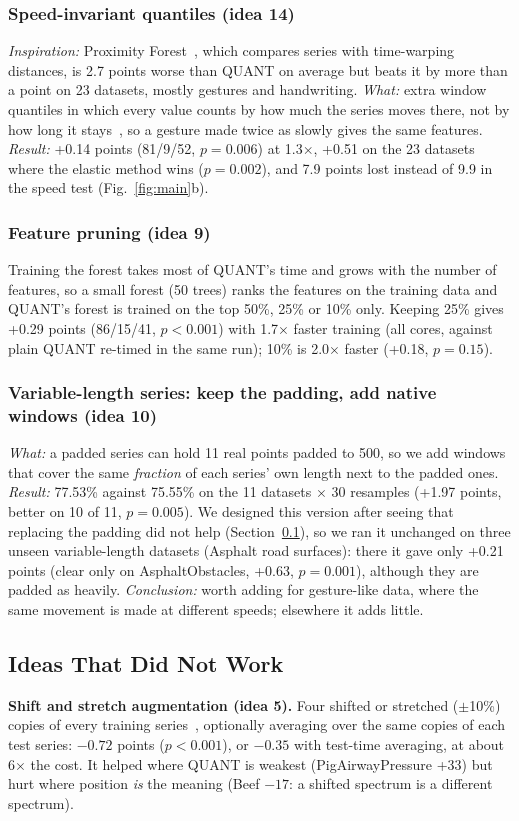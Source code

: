 \documentclass[conference]{IEEEtran}
\begin{document}
\subsubsection{Speed-invariant quantiles (idea 14)}
\emph{Inspiration:} Proximity Forest~\cite{pf}, which compares series with time-warping distances, is 2.7 points worse than QUANT on average but beats it by more than a point on 23 datasets, mostly gestures and handwriting. \emph{What:} extra window quantiles in which every value counts by how much the series moves there, not by how long it stays~\cite{banach}, so a gesture made twice as slowly gives the same features. \emph{Result:} +0.14 points (81/9/52, $p=0.006$) at 1.3$\times$, +0.51 on the 23 datasets where the elastic method wins ($p=0.002$), and 7.9 points lost instead of 9.9 in the speed test (Fig.~\ref{fig:main}b).

\subsubsection{Feature pruning (idea 9)}
Training the forest takes most of QUANT's time and grows with the number of features, so a small forest (50 trees) ranks the features on the training data and QUANT's forest is trained on the top 50\%, 25\% or 10\% only. Keeping 25\% gives +0.29 points (86/15/41, $p<0.001$) with 1.7$\times$ faster training (all cores, against plain QUANT re-timed in the same run); 10\% is 2.0$\times$ faster (+0.18, $p=0.15$).

\subsubsection{Variable-length series: keep the padding, add native windows (idea 10)}
\label{sec:varlen}
\emph{What:} a padded series can hold 11 real points padded to 500, so we add windows that cover the same \emph{fraction} of each series' own length next to the padded ones. \emph{Result:} 77.53\% against 75.55\% on the 11 datasets $\times$ 30 resamples (+1.97 points, better on 10 of 11, $p=0.005$). We designed this version after seeing that replacing the padding did not help (Section~\ref{sec:failed}), so we ran it unchanged on three unseen variable-length datasets (Asphalt road surfaces): there it gave only +0.21 points (clear only on AsphaltObstacles, +0.63, $p=0.001$), although they are padded as heavily. \emph{Conclusion:} worth adding for gesture-like data, where the same movement is made at different speeds; elsewhere it adds little.

\subsection{Ideas That Did Not Work}
\label{sec:failed}
\textbf{Shift and stretch augmentation (idea 5).} Four shifted or stretched ($\pm$10\%) copies of every training series~\cite{leguennec}, optionally averaging over the same copies of each test series: $-0.72$ points ($p<0.001$), or $-0.35$ with test-time averaging, at about 6$\times$ the cost. It helped where QUANT is weakest (PigAirwayPressure +33) but hurt where position \emph{is} the meaning (Beef $-17$: a shifted spectrum is a different spectrum).
\end{document}
